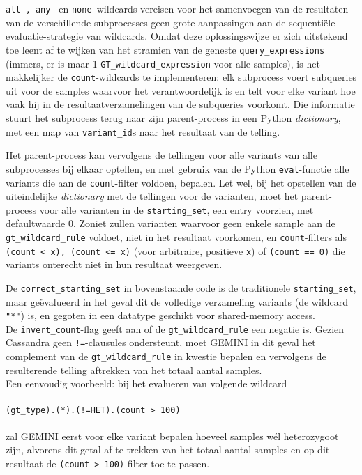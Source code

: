 

\texttt{all-, any-} en \texttt{none-}wildcards vereisen voor het samenvoegen van de resultaten van de verschillende subprocesses geen grote aanpassingen aan de sequenti\"ele evaluatie-strategie van wildcards. Omdat deze oplossingswijze er zich uitstekend toe leent af te wijken van het stramien van de geneste \texttt{query\_expressions} (immers, er is maar 1 \texttt{GT\_wildcard\_expression} voor alle samples), is het makkelijker de \texttt{count}-wildcards te implementeren: elk subprocess voert subqueries uit voor de samples waarvoor het verantwoordelijk is en telt voor elke variant hoe vaak hij in de resultaatverzamelingen van de subqueries voorkomt. Die informatie stuurt het subprocess terug naar zijn parent-process in een Python \textit{dictionary}, met een map van \texttt{variant\_id}s naar het resultaat van de telling.



Het parent-process kan vervolgens de tellingen voor alle variants van alle subprocesses bij elkaar optellen, en met gebruik van de Python \texttt{eval}-functie alle variants die aan de \texttt{count}-filter voldoen, bepalen. Let wel, bij het opstellen van de uiteindelijke \textit{dictionary} met de tellingen voor de varianten, moet het parent-process voor alle varianten in de \texttt{starting\_set}, een entry voorzien, met defaultwaarde 0. Zoniet zullen varianten waarvoor geen enkele sample aan de \texttt{gt\_wildcard\_rule} voldoet, niet in het resultaat voorkomen, en \texttt{count}-filters als \texttt{(count < x), (count <= x)} (voor arbitraire, positieve \texttt{x}) of \texttt{(count == 0)}  die variants onterecht niet in hun resultaat weergeven.



\noindent De \texttt{correct\_starting\_set} in bovenstaande code is de traditionele \texttt{starting\_set}, maar ge\"evalueerd in het geval dit de volledige verzameling variants (de wildcard \texttt{"*"}) is, en gegoten in een datatype geschikt voor shared-memory access.\\
De \texttt{invert\_count}-flag geeft aan of de \texttt{gt\_wildcard\_rule} een negatie is. Gezien Cassandra geen \texttt{!=}-clausules ondersteunt, moet GEMINI in dit geval het complement van de \texttt{gt\_wildcard\_rule} in kwestie bepalen en vervolgens de resulterende telling aftrekken van het totaal aantal samples. \\ Een eenvoudig voorbeeld: bij het evalueren van volgende wildcard \\\\ 
\texttt{(gt\_type).(*).(!=HET).(count > 100)}\\\\
zal GEMINI eerst voor elke variant bepalen hoeveel samples w\'el heterozygoot zijn, alvorens dit getal af te trekken van het totaal aantal samples en op dit resultaat de \texttt{(count > 100)}-filter toe te passen.

